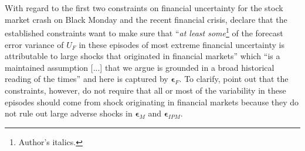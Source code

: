 \documentclass[a4paper,11pt,listof=nochaptergap,oneside,pointednumbers,bibtotoc,bigheadings,liststotoc]{scrbook}
\theoremstyle{mysatz}
\theoremstyle{mydefinition}
\theoremstyle{mybemerkung}
\newcommand{\vect}[1]{\boldsymbol{\mathbf{#1}}}
\begin{document}
\begin{itemize}
\\
\\
With regard to the first two constraints on financial uncertainty for the stock market crash on Black Monday and the recent financial crisis, \citet{ludvigsonetal:18} declare that the established constraints want to make sure that ``\textit{at least some}\footnote{Author's italics.} of the forecast error variance of $U_F$ in these episodes of most extreme financial uncertainty is attributable to large shocks that originated in financial markets'' which ``is a maintained assumption [...] that we argue is grounded in a broad historical reading of the times'' \citep[p. 8]{ludvigsonetal:18} and here is captured by $\vect{\epsilon}_F$. To clarify, \citet{ludvigsonetal:18} point out that the constraints, however, do not require that all or most of the variability in these episodes should come from shock originating in financial markets because they do not rule out large adverse shocks in $\vect{\epsilon}_M$ and $\vect{\epsilon}_{IPM}$. 





\end{itemize}
\end{document}
